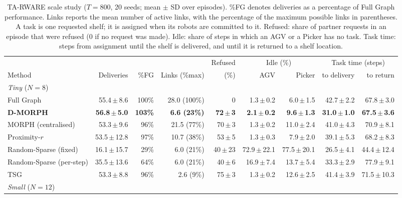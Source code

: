 \begin{table}[!ht]
\centering
\caption{TA-RWARE scale study ($T=800$, 20 seeds; mean $\pm$ SD over episodes). \%FG denotes deliveries as a percentage of Full Graph performance. Links reports the mean number of active links, with the percentage of the maximum possible links in parentheses. A task is one requested shelf; it is assigned when its robots are committed to it. Refused: share of partner requests in an episode that were refused (0 if no request was made). Idle: share of steps in which an AGV or a Picker has no task. Task time: steps from assignment until the shelf is delivered, and until it is returned to a shelf location.}
\label{tab:main}
\footnotesize
\begin{tabular}{lrrrrrrrr}
\hline
 & & & & Refused & \multicolumn{2}{c}{Idle (\%)} & \multicolumn{2}{c}{Task time (steps)} \\
Method & Deliveries & \%FG & Links (\%max) & (\%) & AGV & Picker & to delivery & to return \\
\hline
\multicolumn{9}{l}{\textit{Tiny} ($N=8$)} \\
Full Graph & 55.4\,$\pm$\,8.6 & 100\% & 28.0 (100\%) & 0 & 1.3\,$\pm$\,0.2 & 6.0\,$\pm$\,1.5 & 42.7\,$\pm$\,2.2 & 67.8\,$\pm$\,3.0 \\
\textbf{D-MORPH} & \textbf{56.8\,$\pm$\,5.0} & \textbf{103\%} & \textbf{6.6 (23\%)} & \textbf{72\,$\pm$\,3} & \textbf{2.1\,$\pm$\,0.2} & \textbf{9.6\,$\pm$\,1.3} & \textbf{31.0\,$\pm$\,1.0} & \textbf{67.5\,$\pm$\,3.6} \\
MORPH (centralised) & 53.3\,$\pm$\,9.6 & 96\% & 21.5 (77\%) & 70\,$\pm$\,3 & 1.3\,$\pm$\,0.2 & 11.0\,$\pm$\,2.4 & 41.0\,$\pm$\,4.3 & 70.9\,$\pm$\,8.1 \\
Proximity-$r$ & 53.5\,$\pm$\,12.8 & 97\% & 10.7 (38\%) & 53\,$\pm$\,5 & 1.3\,$\pm$\,0.3 & 7.9\,$\pm$\,2.0 & 39.1\,$\pm$\,5.3 & 68.2\,$\pm$\,8.3 \\
Random-Sparse (fixed) & 16.1\,$\pm$\,15.7 & 29\% & 6.0 (21\%) & 40\,$\pm$\,23 & 72.9\,$\pm$\,22.1 & 77.5\,$\pm$\,20.1 & 26.5\,$\pm$\,4.1 & 44.4\,$\pm$\,12.4 \\
Random-Sparse (per-step) & 35.5\,$\pm$\,13.6 & 64\% & 6.0 (21\%) & 40\,$\pm$\,6 & 16.9\,$\pm$\,7.4 & 13.7\,$\pm$\,5.4 & 33.3\,$\pm$\,2.9 & 77.9\,$\pm$\,9.1 \\
TSG & 53.3\,$\pm$\,8.8 & 96\% & 2.6 (9\%) & 75\,$\pm$\,3 & 1.3\,$\pm$\,0.2 & 12.6\,$\pm$\,2.5 & 41.4\,$\pm$\,3.9 & 71.5\,$\pm$\,10.3 \\
\hline
\multicolumn{9}{l}{\textit{Small} ($N=12$)} \\

\end{tabular}
\end{table}
